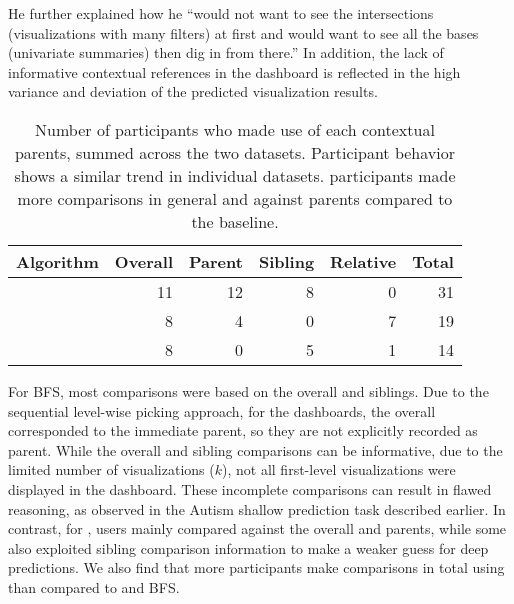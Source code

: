He further explained how he ``would not want to see the intersections (visualizations with many filters) at first and would want to see all the bases (univariate summaries) then dig in from there.'' In addition, the lack of informative contextual references in the \cluster dashboard is reflected in the high variance and deviation of the predicted visualization results.
\begin{table}[h!]
\centering
	\begin{tabular}{l|rrrr|r}
	\hline
	 Algorithm   &   Overall &   Parent &   Sibling &   Relative &   Total \\
	\hline
	 \system     &        11 &      \cellcolor{blue!25} 12 &         8 &          0 &      \cellcolor{blue!25} 31 \\
	 \cluster     &         8 &        4 &         0 &          7 &      19 \\
	 \BFS         &         8 &        0 &         5 &          1 &      14 \\
	\hline
	\end{tabular}
\caption{Number of participants who made use of each contextual parents, summed across the two datasets. Participant behavior shows a similar trend in individual datasets. \system participants made more comparisons in general and against parents compared to the baseline.}
\label{table:contextualReferenceCount}
\end{table}
\par For BFS, most comparisons were based on the overall and siblings. Due to the sequential level-wise picking approach, for the \BFS dashboards, the overall corresponded to the immediate parent, so they are not explicitly recorded as parent. While the overall and sibling comparisons can be informative, due to the limited number of visualizations ($k$), not all first-level visualizations were displayed in the dashboard. These incomplete comparisons can result in flawed reasoning, as observed in the Autism shallow prediction task described earlier. In contrast, for \system, users mainly compared against the overall and parents, while some also exploited sibling comparison information to make a weaker guess for deep predictions. We also find that more participants make comparisons in total using \system than compared to \cluster and BFS.

